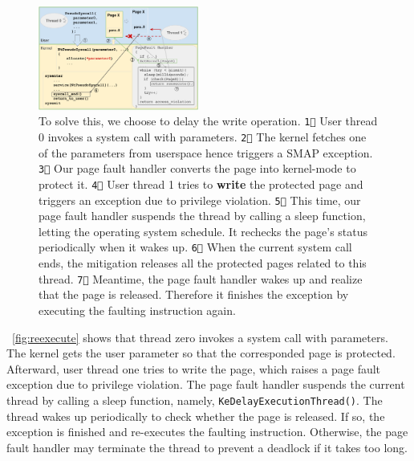 \begin{figure}[th]
  \includegraphics[width=0.47\textwidth]{figures/reexecute2}
  \centering
  \caption{To solve this, we choose to delay the write operation. \texttt{\textcircled{1}}  User thread 0 invokes a system call with parameters. \texttt{\textcircled{2}} The kernel fetches one of the parameters from userspace hence triggers a SMAP exception. \texttt{\textcircled{3}} Our page fault handler converts the page into kernel-mode to protect it.  \texttt{\textcircled{4}} User thread 1 tries to \textbf{write} the protected page and triggers an exception due to privilege violation. \texttt{\textcircled{5}} This time, our page fault handler suspends the thread by calling a sleep function, letting the operating system schedule.  It rechecks the page's status periodically when it wakes up. \texttt{\textcircled{6}} When the current system call ends, the mitigation releases all the protected pages related to this thread. \texttt{\textcircled{7}} Meantime, the page fault handler wakes up and realize that the page is released. Therefore it finishes the exception by executing the faulting instruction again.}
  \label{fig:reexecute}
\end{figure}



~\autoref{fig:reexecute} shows that thread zero invokes a system call with parameters. The kernel gets the user parameter so that the corresponded page is protected. Afterward, user thread one tries to write the page, which raises a page fault exception due to privilege violation. The page fault handler suspends the current thread by calling a sleep function, namely, \texttt{KeDelayExecutionThread()}. The thread wakes up periodically to check whether the page is released. If so, the exception is finished and re-executes the faulting instruction. Otherwise, the page fault handler may terminate the thread to prevent a deadlock if it takes too long.



